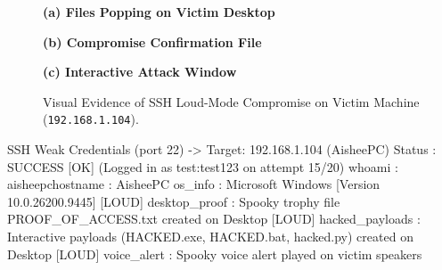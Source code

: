 \begin{figure}[htbp]
\centering
\begin{minipage}[t]{0.32\textwidth}
\centering
{\color{accent}\sffamily\bfseries\scriptsize (a) Files Popping on Victim Desktop}\\[3pt]
\end{minipage}%
\hfill
\begin{minipage}[t]{0.32\textwidth}
\centering
{\color{accent}\sffamily\bfseries\scriptsize (b) Compromise Confirmation File}\\[3pt]
\end{minipage}%
\hfill
\begin{minipage}[t]{0.32\textwidth}
\centering
{\color{accent}\sffamily\bfseries\scriptsize (c) Interactive Attack Window}\\[3pt]
\end{minipage}
\caption{Visual Evidence of SSH Loud-Mode Compromise on Victim Machine (\texttt{192.168.1.104}).}
\label{fig:ssh_showcase}
\end{figure}

\begin{logbox}
[EXPLOIT] SSH Weak Credentials (port 22) -> Target: 192.168.1.104 (AisheePC)
  Status   : SUCCESS [OK]  (Logged in as test:test123 on attempt 15/20)
  whoami   : aisheepc\test             hostname : AisheePC
  os_info  : Microsoft Windows [Version 10.0.26200.9445]
  [LOUD] desktop_proof   : Spooky trophy file PROOF_OF_ACCESS.txt created on Desktop
  [LOUD] hacked_payloads : Interactive payloads (HACKED.exe, HACKED.bat, hacked.py) created on Desktop
  [LOUD] voice_alert     : Spooky voice alert played on victim speakers
\end{logbox}
